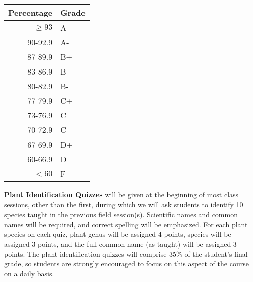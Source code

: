 \documentclass{tufte-handout}
\begin{document}
\begin{margintable}
\begin{tabular}{rl}
Percentage & Grade \\
\hline 
$\ge93$ & A \\
90-92.9 & A- \\
87-89.9 & B+ \\
83-86.9 & B \\
80-82.9 & B- \\
77-79.9 & C+ \\
73-76.9 & C \\
70-72.9 & C- \\
67-69.9 & D+ \\
60-66.9 & D \\
$<60$ & F \\
\hline
\end{tabular}
\end{margintable}

	

\textbf{Plant Identification Quizzes} will be given at the beginning of most class sessions, other than the first, during which we will ask students to identify 10 species taught in the previous field session(s). Scientific names and common names will be required, and correct spelling will be emphasized. For each plant species on each quiz, plant genus will be assigned 4 points, species will be assigned 3 points, and the full common name (as taught) will be assigned 3 points. The plant identification quizzes will comprise 35\% of the student’s final grade, so students are strongly encouraged to focus on this aspect of the course on a daily basis.
\end{document}
